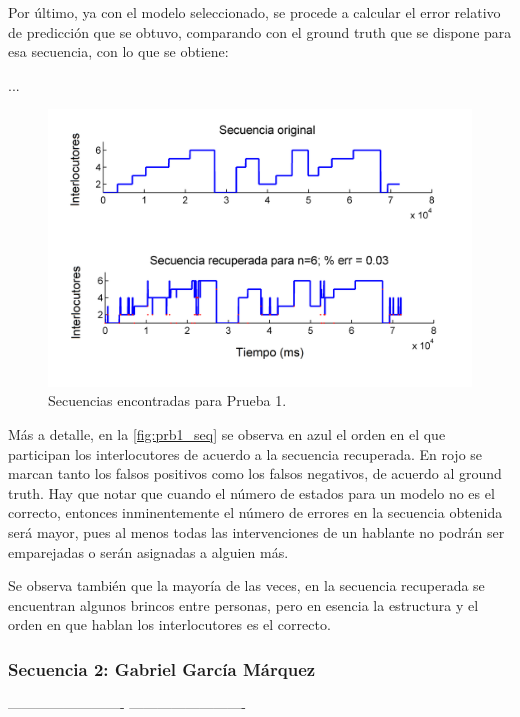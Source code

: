 Por último, ya con el modelo seleccionado, se procede a calcular el error relativo de predicción que se obtuvo, comparando con el ground truth que se dispone para esa secuencia, con lo que se obtiene: 

...

\begin{figure}[H]
  \centerline
  {\includegraphics[width=0.8\linewidth]{gfx/chap6/cuervo1_}} \quad
  \caption{Secuencias encontradas para Prueba 1.}
  \label{fig:prb1_seq}
\end{figure}

Más a detalle, en la \autoref{fig:prb1_seq} se observa en azul el orden en el que participan los interlocutores de acuerdo a la secuencia recuperada. En rojo se marcan tanto los falsos positivos como los falsos negativos, de acuerdo al ground truth. Hay que notar que cuando el número de estados para un modelo no es el correcto, entonces inminentemente el número de errores en la secuencia obtenida será mayor, pues al menos todas las intervenciones de un hablante no podrán ser emparejadas o serán asignadas a alguien más.

Se observa también que la mayoría de las veces, en la secuencia recuperada se encuentran algunos brincos entre personas, pero en esencia la estructura y el orden en que hablan los interlocutores es el correcto.

\newpage
\subsubsection{Secuencia 2: Gabriel García Márquez}

-------------------------
-------------------------

